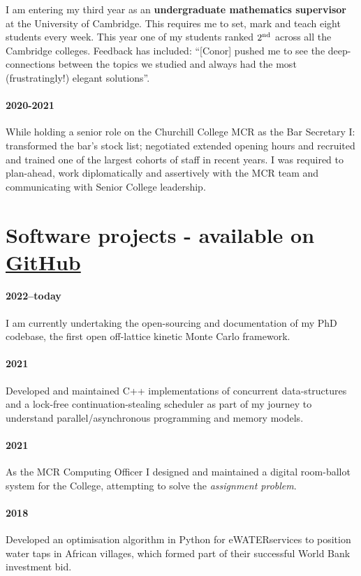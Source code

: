 \documentclass[11pt]{article}
\begin{document}
I am entering my third year as an \textbf{undergraduate mathematics supervisor} at the University of Cambridge. This requires me to set, mark and teach eight students every week. This year one of my students ranked $2\textsuperscript{nd}$ across all the Cambridge colleges. Feedback has included: ``[Conor] pushed me to see the deep-connections between the topics we studied and always had the most (frustratingly!) elegant solutions''. 

\paragraph*{2020-2021} While holding a senior role on the Churchill College MCR as the Bar Secretary I: transformed the bar's stock list; negotiated extended opening hours and recruited and trained one of the largest cohorts of staff in recent years. I was required to plan-ahead, work diplomatically and assertively with the MCR team and communicating with Senior College leadership.

\section*{Software projects - available on \href{https://github.com/ConorWilliams}{ GitHub \faGithub}}

\paragraph*{2022--today} I am currently undertaking the open-sourcing and documentation of my PhD codebase, the first open off-lattice kinetic Monte Carlo framework. 

\paragraph*{2021} Developed and maintained C++ implementations of concurrent data-structures and a lock-free continuation-stealing scheduler as part of my journey to understand parallel/asynchronous programming and memory models.

\paragraph*{2021} As the MCR Computing Officer I designed and maintained a digital room-ballot system for the College, attempting to solve the \emph{assignment problem}.

\paragraph*{2018} Developed an optimisation algorithm in Python for eWATERservices to position water taps in African villages, which formed part of their successful World Bank investment bid. 
\end{document}

